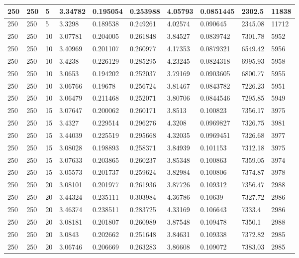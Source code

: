 \begin{landscape}
\begin{longtable}{ | l | l | l | l | l | l | l | l | l | l | }
250 & 250 & 5 & 3.34782 & 0.195054 & 0.253988 & 4.05793 & 0.0851445 & 2302.5 & 11838\\ \hline
250 & 250 & 5 & 3.3298 & 0.189538 & 0.249261 & 4.02574 & 0.090645 & 2345.08 & 11712\\ \hline
250 & 250 & 10 & 3.07781 & 0.204005 & 0.261848 & 3.84527 & 0.0839742 & 7301.78 & 5952\\ \hline
250 & 250 & 10 & 3.40969 & 0.201107 & 0.260977 & 4.17353 & 0.0879321 & 6549.42 & 5956\\ \hline
250 & 250 & 10 & 3.4238 & 0.226129 & 0.285295 & 4.23245 & 0.0824318 & 6995.93 & 5958\\ \hline
250 & 250 & 10 & 3.0653 & 0.194202 & 0.252037 & 3.79169 & 0.0903605 & 6800.77 & 5955\\ \hline
250 & 250 & 10 & 3.06766 & 0.19678 & 0.256724 & 3.81467 & 0.0843782 & 7226.23 & 5951\\ \hline
250 & 250 & 10 & 3.06479 & 0.211468 & 0.252071 & 3.80706 & 0.0844546 & 7295.85 & 5949\\ \hline
250 & 250 & 15 & 3.07647 & 0.200062 & 0.260171 & 3.8513 & 0.100823 & 7356.17 & 3975\\ \hline
250 & 250 & 15 & 3.4327 & 0.229514 & 0.296276 & 4.3208 & 0.0969827 & 7326.75 & 3981\\ \hline
250 & 250 & 15 & 3.44039 & 0.225519 & 0.295668 & 4.32035 & 0.0969451 & 7326.68 & 3977\\ \hline
250 & 250 & 15 & 3.08028 & 0.198893 & 0.258371 & 3.84939 & 0.101153 & 7312.18 & 3975\\ \hline
250 & 250 & 15 & 3.07633 & 0.203865 & 0.260237 & 3.85348 & 0.100863 & 7359.05 & 3974\\ \hline
250 & 250 & 15 & 3.05573 & 0.201737 & 0.259624 & 3.82984 & 0.100806 & 7374.87 & 3978\\ \hline
250 & 250 & 20 & 3.08101 & 0.201977 & 0.261936 & 3.87726 & 0.109312 & 7356.47 & 2988\\ \hline
250 & 250 & 20 & 3.44324 & 0.235111 & 0.303984 & 4.36786 & 0.10639 & 7327.72 & 2986\\ \hline
250 & 250 & 20 & 3.46374 & 0.238511 & 0.283725 & 4.33169 & 0.106643 & 7333.4 & 2986\\ \hline
250 & 250 & 20 & 3.08181 & 0.201807 & 0.260989 & 3.87548 & 0.109478 & 7350.1 & 2988\\ \hline
250 & 250 & 20 & 3.0843 & 0.202662 & 0.251648 & 3.84631 & 0.109338 & 7372.82 & 2985\\ \hline
250 & 250 & 20 & 3.06746 & 0.206669 & 0.263283 & 3.86608 & 0.109072 & 7383.03 & 2985\\ \hline

\end{longtable}
\end{landscape}
